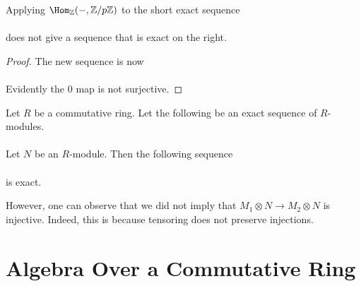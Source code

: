 \documentclass[a4paper]{article}
\begin{document}
\begin{eg}{}{} Applying $\Hom_\Z(-,\Z/p\Z)$ to the short exact sequence \\
\\
does not give a sequence that is exact on the right. 
\begin{proof}
The new sequence is now \\
\\
Evidently the $0$ map is not surjective. 
\end{proof}
\end{eg}

\begin{prp}{}{} Let $R$ be a commutative ring. Let the following be an exact sequence of $R$-modules. \\
\\ Let $N$ be an $R$-module. Then the following sequence \\
 \\
is exact. 
\end{prp}

However, one can observe that we did not imply that $M_1\otimes N\to M_2\otimes N$ is injective. Indeed, this is because tensoring does not preserve injections. 

\pagebreak
\section{Algebra Over a Commutative Ring}
\end{document}
